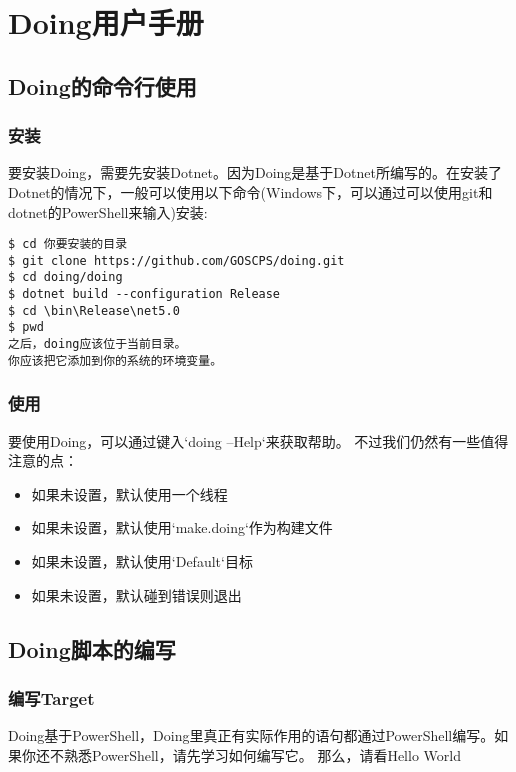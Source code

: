 \chapter{Doing用户手册}

\section{Doing的命令行使用}

\subsection{安装}

要安装Doing，需要先安装Dotnet。因为Doing是基于Dotnet所编写的。在安装了Dotnet的情况下，一般可以使用以下命令(Windows下，可以通过可以使用git和dotnet的PowerShell来输入)安装:
\begin{lstlisting}
$ cd 你要安装的目录
$ git clone https://github.com/GOSCPS/doing.git
$ cd doing/doing
$ dotnet build --configuration Release
$ cd \bin\Release\net5.0
$ pwd
之后，doing应该位于当前目录。
你应该把它添加到你的系统的环境变量。
\end{lstlisting}


\subsection{使用}
要使用Doing，可以通过键入`doing --Help`来获取帮助。\newline{}
不过我们仍然有一些值得注意的点：\newline{}
\begin{itemize}
	\item 如果未设置，默认使用一个线程
	\item 如果未设置，默认使用`make.doing`作为构建文件
	\item 如果未设置，默认使用`Default`目标
	\item 如果未设置，默认碰到错误则退出
\end{itemize}



\section{Doing脚本的编写}
\subsection{编写Target}

Doing基于PowerShell，Doing里真正有实际作用的语句都通过PowerShell编写。如果你还不熟悉PowerShell，请先学习如何编写它。
那么，请看Hello World


